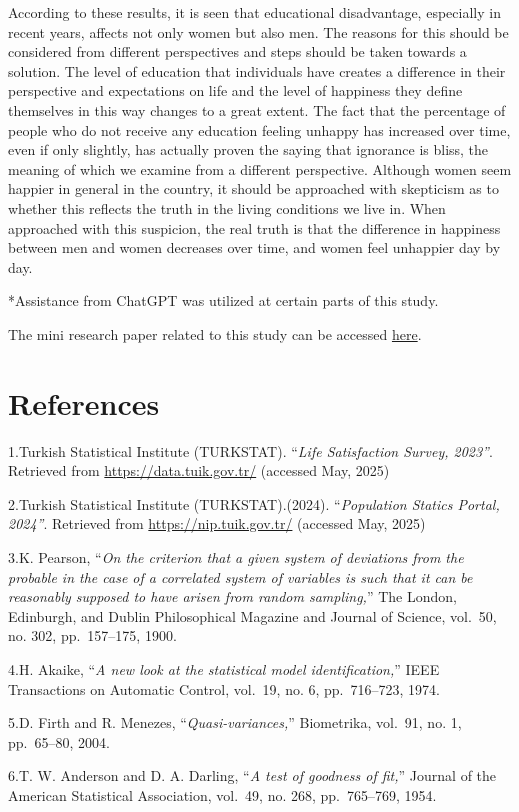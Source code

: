 \documentclass[
  11pt,
  a4paper,
  DIV=11,
  numbers=noendperiod]{scrartcl}
\begin{document}
According to these results, it is seen that educational disadvantage,
especially in recent years, affects not only women but also men. The
reasons for this should be considered from different perspectives and
steps should be taken towards a solution. The level of education that
individuals have creates a difference in their perspective and
expectations on life and the level of happiness they define themselves
in this way changes to a great extent. The fact that the percentage of
people who do not receive any education feeling unhappy has increased
over time, even if only slightly, has actually proven the saying that
ignorance is bliss, the meaning of which we examine from a different
perspective. Although women seem happier in general in the country, it
should be approached with skepticism as to whether this reflects the
truth in the living conditions we live in. When approached with this
suspicion, the real truth is that the difference in happiness between
men and women decreases over time, and women feel unhappier day by day.

*Assistance from ChatGPT was utilized at certain parts of this study.

The mini research paper related to this study can be accessed
\href{assets/documents/Paper.pdf}{here}.

\section{References}\label{references}

1.Turkish Statistical Institute (TURKSTAT). ``\emph{Life Satisfaction
Survey, 2023''}. Retrieved from \url{https://data.tuik.gov.tr/}
(accessed May, 2025)

2.Turkish Statistical Institute (TURKSTAT).(2024). ``\emph{Population
Statics Portal, 2024''}. Retrieved from \url{https://nip.tuik.gov.tr/}
(accessed May, 2025)

3.K. Pearson, ``\emph{On the criterion that a given system of deviations
from the probable in the case of a correlated system of variables is
such that it can be reasonably supposed to have arisen from random
sampling,}'' The London, Edinburgh, and Dublin Philosophical Magazine
and Journal of Science, vol.~50, no. 302, pp.~157--175, 1900.

4.H. Akaike, ``\emph{A new look at the statistical model
identification,}'' IEEE Transactions on Automatic Control, vol.~19, no.
6, pp.~716--723, 1974.

5.D. Firth and R. Menezes, ``\emph{Quasi-variances,}'' Biometrika,
vol.~91, no. 1, pp.~65--80, 2004.

6.T. W. Anderson and D. A. Darling, ``\emph{A test of goodness of
fit,}'' Journal of the American Statistical Association, vol.~49, no.
268, pp.~765--769, 1954.
\end{document}
